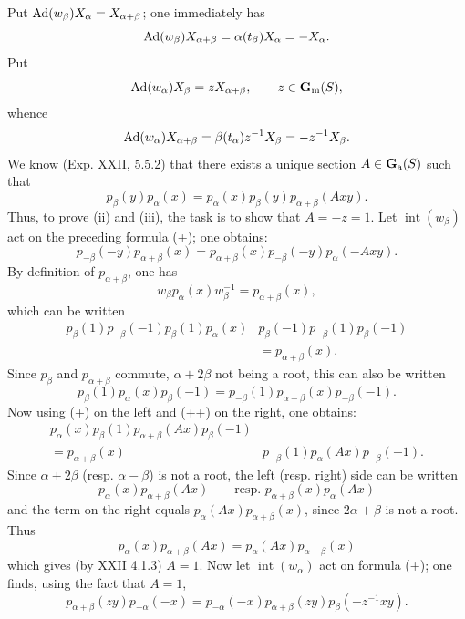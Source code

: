 Put $\operatorname{Ad}(w_\beta)X_\alpha=X_{\alpha+\beta}$; one immediately has
\[
\operatorname{Ad}(w_\beta)X_{\alpha+\beta}=\alpha(t_\beta)X_\alpha=-X_\alpha.
\]
Put
\[
\operatorname{Ad}(w_\alpha)X_\beta=zX_{\alpha+\beta},\qquad z\in\mathbf{G}_{\mathrm{m}}(S),
\]
whence
\[
\operatorname{Ad}(w_\alpha)X_{\alpha+\beta}=\beta(t_\alpha)z^{-1}X_\beta=-z^{-1}X_\beta.
\]
We know (Exp. XXII, 5.5.2) that there exists a unique section $A\in\mathbf{G}_{\mathrm{a}}(S)$ such that
\begin{equation}\tag{+}
p_\beta(y)p_\alpha(x)=p_\alpha(x)p_\beta(y)p_{\alpha+\beta}(Axy).
\end{equation}
Thus, to prove (ii) and (iii), the task is to show that $A=-z=1$.
Let $\operatorname{int}(w_\beta)$ act on the preceding formula (+); one obtains:
\begin{equation}\tag{++}
p_{-\beta}(-y)p_{\alpha+\beta}(x)=p_{\alpha+\beta}(x)p_{-\beta}(-y)p_\alpha(-Axy).
\end{equation}
By definition of $p_{\alpha+\beta}$, one has
\[
w_\beta p_\alpha(x)w_\beta^{-1}=p_{\alpha+\beta}(x),
\]
which can be written
\[
\begin{split}
p_\beta(1)p_{-\beta}(-1)p_\beta(1)p_\alpha(x)&p_\beta(-1)p_{-\beta}(1)p_\beta(-1)\\
&=p_{\alpha+\beta}(x).
\end{split}
\]
Since $p_\beta$ and $p_{\alpha+\beta}$ commute, $\alpha+2\beta$ not being a root, this can also be written
\[
p_\beta(1)p_\alpha(x)p_\beta(-1)=p_{-\beta}(1)p_{\alpha+\beta}(x)p_{-\beta}(-1).
\]
Now using (+) on the left and (++) on the right, one obtains:
\[
\begin{split}
p_\alpha(x)p_\beta(1)p_{\alpha+\beta}(Ax)p_\beta(-1)&\\
{}=p_{\alpha+\beta}(x)&p_{-\beta}(1)p_\alpha(Ax)p_{-\beta}(-1).
\end{split}
\]
Since $\alpha+2\beta$ (resp. $\alpha-\beta$) is not a root, the left (resp. right) side can be written
\[
p_\alpha(x)p_{\alpha+\beta}(Ax)\qquad\text{resp. }p_{\alpha+\beta}(x)p_\alpha(Ax)
\]
and the term on the right equals $p_\alpha(Ax)p_{\alpha+\beta}(x)$, since $2\alpha+\beta$ is not a root. Thus
\[
p_\alpha(x)p_{\alpha+\beta}(Ax)=p_\alpha(Ax)p_{\alpha+\beta}(x)
\]
which gives (by XXII 4.1.3) $A=1$.
Now let $\operatorname{int}(w_\alpha)$ act on formula (+); one finds, using the fact that $A=1$,
\begin{equation}\tag{+++}
p_{\alpha+\beta}(zy)p_{-\alpha}(-x)=p_{-\alpha}(-x)p_{\alpha+\beta}(zy)p_\beta(-z^{-1}xy).
\end{equation}
